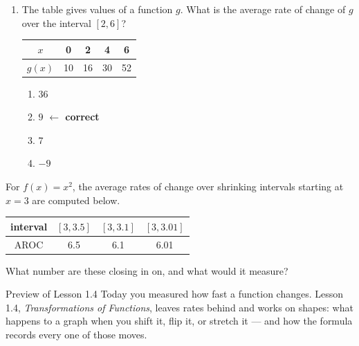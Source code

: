 \documentclass[10pt]{article}
\begin{document}
\begin{enumerate}[itemsep=10pt]
\begin{enumerate}[label=(\alph*), itemsep=4pt]
  \item $A$ is a  function, and it is concave .
  \item $B$ is a  function, with slope .
\end{enumerate}

\item The table gives values of a function $g$. What is the average rate of
      change of $g$ over the interval $[2, 6]$?

\smallskip
\renewcommand{\arraystretch}{1.4}
\begin{tabular}{|c|c|c|c|c|}
\hline
$x$ & 0 & 2 & 4 & 6 \\
\hline
$g(x)$ & 10 & 16 & 30 & 52 \\
\hline
\end{tabular}
\smallskip

\begin{enumerate}[label=\Alph*., itemsep=3pt]
  \item $36$
  \item $9$ \quad \textcolor{keyred}{\textbf{$\leftarrow$ correct}}
  \item $7$
  \item $-9$
\end{enumerate}

\end{enumerate}

\vspace{0.1in}

\boxguard
\begin{extensionbox}
For $f(x) = x^2$, the average rates of change over shrinking intervals
starting at $x = 3$ are computed below.

\smallskip
\begin{center}
\renewcommand{\arraystretch}{1.4}
\begin{tabular}{|c|c|c|c|}
\hline
interval & $[3, 3.5]$ & $[3, 3.1]$ & $[3, 3.01]$ \\
\hline
AROC & 6.5 & 6.1 & 6.01 \\
\hline
\end{tabular}
\end{center}
\smallskip

What number are these closing in on, and what would it measure?

\vspace{0.05in}
\end{extensionbox}

\vspace{0.1in}

\boxguard[9]
\begin{notesbox}{Preview of Lesson 1.4}
Today you measured how fast a function changes. Lesson 1.4,
\textit{Transformations of Functions}, leaves rates behind and works on
shapes: what happens to a graph when you shift it, flip it, or stretch it ---
and how the formula records every one of those moves.
\end{notesbox}
\end{document}

